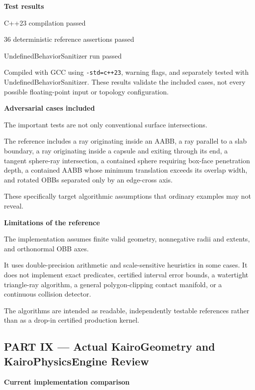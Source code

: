 \textbf{Test results}

C++23 compilation passed

36 deterministic reference assertions passed

UndefinedBehaviorSanitizer run passed

Compiled with GCC using \texttt{-std=c++23}, warning flags, and separately tested with UndefinedBehaviorSanitizer. These results validate the included cases, not every possible floating-point input or topology configuration.

\textbf{Adversarial cases included}

The important tests are not only conventional surface intersections.

The reference includes a ray originating inside an AABB, a ray parallel to a slab boundary, a ray originating inside a capsule and exiting through its end, a tangent sphere-ray intersection, a contained sphere requiring box-face penetration depth, a contained AABB whose minimum translation exceeds its overlap width, and rotated OBBs separated only by an edge-cross axis.

These specifically target algorithmic assumptions that ordinary examples may not reveal.

\textbf{Limitations of the reference}

The implementation assumes finite valid geometry, nonnegative radii and extents, and orthonormal OBB axes.

It uses double-precision arithmetic and scale-sensitive heuristics in some cases. It does not implement exact predicates, certified interval error bounds, a watertight triangle-ray algorithm, a general polygon-clipping contact manifold, or a continuous collision detector.

The algorithms are intended as readable, independently testable references rather than as a drop-in certified production kernel.

\subsection{PART IX --- Actual KairoGeometry and KairoPhysicsEngine Review}\label{04-visual-computing-ii-ch025-part-ix-actual-kairogeometry-and-kairophysicsengine-review}

\textbf{Current implementation comparison}

